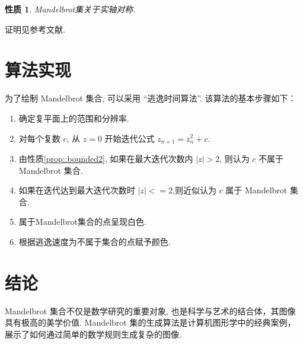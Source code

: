 \documentclass[12pt,a4paper]{ctexart}
\newtheorem{property}{性质}
\begin{document}
\begin{property}
    \label{prop::symmetric}
    Mandelbrot集关于实轴对称.
\end{property}
证明见参考文献\cite{Mandelbrot2017structural}.

\section{算法实现}
为了绘制 Mandelbrot 集合,  可以采用 ``逃逸时间算法''. 该算法的基本步骤如下：

\begin{enumerate}
    \item 确定复平面上的范围和分辨率.
    \item 对每个复数 $ c $, 从 $ z = 0 $ 开始迭代公式 $ z_{n+1} = z_n^2 + c $. 
    \item 由性质\ref{prop::bounded2}, 如果在最大迭代次数内 $ |z| > 2 $,  
    则认为 $ c $ 不属于 Mandelbrot 集合. 
    \item 如果在迭代达到最大迭代次数时 $ |z| <= 2 $,则近似认为 $ c $ 属于 Mandelbrot 集合.
    \item 属于Mandelbrot集合的点呈现白色. 
    \item 根据逃逸速度为不属于集合的点赋予颜色. 
\end{enumerate}

\section{结论}
Mandelbrot 集合不仅是数学研究的重要对象, 也是科学与艺术的结合体，其图像具有极高的美学价值. 
Mandelbrot 集的生成算法是计算机图形学中的经典案例，展示了如何通过简单的数学规则生成复杂的图像.


\end{document}
